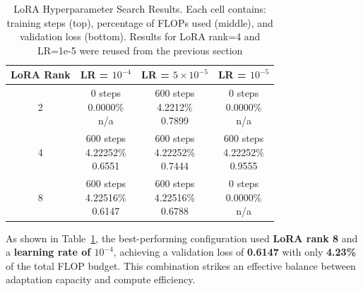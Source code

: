 \documentclass[a4paper,12pt]{article}
\begin{document}
\vspace{0.2cm}

\begin{table}[H]
  \centering
  \begin{tabular}{|c|c|c|c|}
      \hline
      \textbf{LoRA Rank} & \textbf{LR = $10^{-4}$} & \textbf{LR = $5 \times 10^{-5}$} & \textbf{LR = $10^{-5}$} \\
      \hline
      2 & 
      \makecell{0 steps \\ 0.0000\% \\ n/a} & 
      \makecell{600 steps \\ 4.2212\% \\ 0.7899} & 
      \makecell{0 steps \\ 0.0000\% \\ n/a} \\
      \hline
      4 & 
      \makecell{600 steps \\ 4.22252\% \\ 0.6551} & 
      \makecell{600 steps \\ 4.22252\% \\ 0.7444} & 
      \makecell{600 steps \\ 4.22252\% \\ 0.9555} \\
      \hline
      8 & 
      \makecell{600 steps \\ 4.22516\% \\ 0.6147} & 
      \makecell{600 steps \\ 4.22516\% \\ 0.6788} & 
      \makecell{0 steps \\ 0.0000\% \\ n/a} \\
      \hline
  \end{tabular}
  \vspace{0.2cm}
  \caption{LoRA Hyperparameter Search Results. Each cell contains: training steps (top), percentage of FLOPs used (middle), and validation loss (bottom). Results for LoRA rank=4 and LR=1e-5 were reused from the previous section}
  \label{tab:lora_grid_search}
\end{table}

As shown in Table~\ref{tab:lora_grid_search}, the best-performing configuration used \textbf{LoRA rank 8} and a \textbf{learning rate of $10^{-4}$}, achieving a validation loss of \textbf{0.6147} with only \textbf{4.23\%} of the total FLOP budget. This combination strikes an effective balance between adaptation capacity and compute efficiency.
\end{document}
